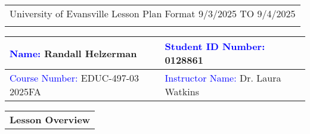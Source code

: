\begin{tabularx}{\textwidth}{Y}
  {\large University of Evansville Lesson Plan Format } 9/3/2025 TO 9/4/2025\\
   \hline \\
\end{tabularx}


\begin{tabularx}{\textwidth}{|X|X|}
  \hline 
  \textcolor{blue}{Name:} Randall Helzerman
  &
  \textcolor{blue}{Student ID Number:} 0128861 \\
  \hline
  
  \textcolor{blue}{Course Number:} EDUC-497-03 2025FA
  &
  \textcolor{blue}{Instructor Name:} Dr. Laura Watkins\\
  \hline
  
\end{tabularx}

\vskip 10pt
  
\begin{tabularx}{\textwidth}{Y}
  {\bf Lesson Overview} \\
\end{tabularx}


